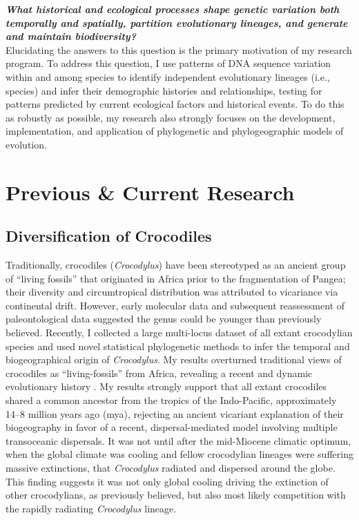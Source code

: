\documentclass[10pt]{article}
\begin{document}
\raggedright
\singlespacing

\textbf{\textit{What historical and ecological processes shape genetic
variation both temporally and spatially, partition evolutionary lineages, and
generate and maintain biodiversity?}} \\
Elucidating the answers to this question is the primary motivation of my
research program.
To address this question, I use patterns of DNA sequence variation within and
among species to identify independent evolutionary lineages (i.e., species) and
infer their demographic histories and relationships, testing for patterns
predicted by current ecological factors and historical events.
To do this as robustly as possible, my research also strongly focuses on the
development, implementation, and application of phylogenetic and
phylogeographic models of evolution.

\section*{Previous \& Current Research}
\subsection*{Diversification of Crocodiles}
Traditionally, crocodiles (\emph{Crocodylus}) have been stereotyped as an
ancient group of ``living fossils'' that originated in Africa prior to the
fragmentation of Pangea; their diversity and circumtropical distribution was
attributed to vicariance via continental drift.
However, early molecular data and subsequent reassessment of paleontological
data suggested the genus could be younger than previously believed.
Recently, I collected a large multi-locus dataset of all extant crocodylian
species and used novel statistical phylogenetic methods to infer the temporal
and biogeographical origin of \emph{Crocodylus}.
My results overturned traditional views of crocodiles as ``living-fossils''
from Africa, revealing a recent and dynamic evolutionary history
.
My results strongly support that all extant crocodiles shared a common ancestor
from the tropics of the Indo-Pacific, approximately 14--8 million years ago
(mya), rejecting an ancient vicariant explanation of their biogeography in
favor of a recent, dispersal-mediated model involving multiple transoceanic
dispersals.
It was not until after the mid-Miocene climatic optimum, when the global
climate was cooling and fellow crocodylian lineages were suffering massive
extinctions, that \emph{Crocodylus} radiated and dispersed around the globe.
This finding suggests it was not only global cooling driving the extinction of
other crocodylians, as previously believed, but also most likely competition
with the rapidly radiating \emph{Crocodylus} lineage.
\end{document}
